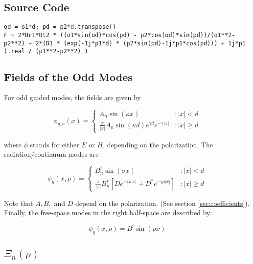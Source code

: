 \documentclass[11pt, oneside]{article}   	%
\begin{document}
\subsection{Source Code}

\begin{lstlisting}
od = o1*d; pd = p2*d.transpose()
F = 2*Br1*Bt2 * ((o1*sin(od)*cos(pd) - p2*cos(od)*sin(pd))/(o1**2-p2**2) + 2*(D1 * (exp(-1j*p1*d) * (p2*sin(pd)-1j*p1*cos(pd))) + 1j*p1 ).real / (p1**2-p2**2) )
\end{lstlisting}




\subsection{Fields of the Odd Modes}

For odd guided modes, the fields are given by 

\[\phi_{y,n}(x) = \left\{
  \begin{array}{lr}
    A_{n}\sin(\kappa x) & : |x| < d\\
    \frac{x}{|x|}A_{n}\sin(\kappa d)e^{\gamma d}e^{-\gamma |x|} & : |x| \ge d
  \end{array}
\right.
\]

\noindent where $\phi$ stands for either $E$ or $H$, depending on the polarization. The radiation/continuum modes are

\[\phi_{y}(x, \rho) = \left\{
  \begin{array}{lr}
    B_{n}^{r}\sin(\sigma x) & : |x| < d\\
    \frac{x}{|x|}B_{n}^{r}\left[De^{-i\rho |x|} + D^{*}e^{-i\rho |x|}\right] & : |x| \ge d
  \end{array}
\right.
\]

\noindent Note that $A, B,$ and $D$ depend on the polarization. (See section \ref{sec:coefficients}).  Finally, the free-space modes in the right half-space are described by:

\[\phi_{y}(x,\rho) = B^{t}\sin(\rho x)\]

\subsection{$\Xi_{n}(\rho)$}
\end{document}
